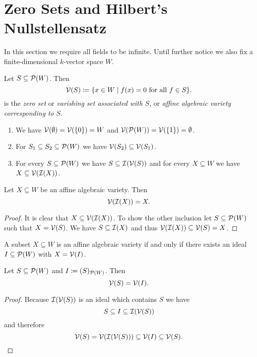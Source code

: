 \section{Zero Sets and Hilbert’s Nullstellensatz}
In this section we require all fields to be infinite.
Until further notice we also fix a finite-dimensional $k$-vector space $W$.


\begin{defi}
  Let $S \subseteq \mathcal{P}(W)$.
  Then
  \[
              \mathcal{V}(S)
    \coloneqq \{
                x \in W
              \mid
                f(x) = 0
                \text{ for all }
                f \in S
              \}.
  \]
  is the \emph{zero set} or \emph{varishing set associated with $S$}, or \emph{affine algebraic variety corresponding to $S$}.
\end{defi}


\begin{expls}
  \begin{enumerate}[label=\emph{\alph*)},leftmargin=*]
    \item
      We have $\mathcal{V}(\emptyset) = \mathcal{V}(\{0\}) = W$ and $\mathcal{V}(\mathcal{P}(W)) = \mathcal{V}(\{1\}) = \emptyset$.
    \item
      For $S_1 \subseteq S_2 \subseteq \mathcal{P}(W)$ we have $\mathcal{V}(S_2) \subseteq \mathcal{V}(S_1)$.
    \item
      For every $S \subseteq \mathcal{P}(W)$ we have $S \subseteq \mathcal{I}(\mathcal{V}(S))$ and for every $X \subseteq W$ we have $X \subseteq \mathcal{V}(\mathcal{I}(X))$.
  \end{enumerate}
\end{expls}


\begin{lem}
  Let $X \subseteq W$ be an affine algebraic variety. Then
  \[
      \mathcal{V}(\mathcal{I}(X))
    = X.
  \]
\end{lem}
\begin{proof}
  It is clear that $X \subseteq \mathcal{V}(\mathcal{I}(X))$.
  To show the other inclusion let $S \subseteq \mathcal{P}(W)$ such that $X = \mathcal{V}(S)$.
  We have $S \subseteq \mathcal{I}(X)$ and thus $\mathcal{V}(\mathcal{I}(X)) \subseteq \mathcal{V}(S) = X$.
\end{proof}


\begin{cor}
  A subset $X \subseteq W$ is an affine algebraic variety if and only if there exists an ideal $I \subseteq \mathcal{P}(W)$ with $X = \mathcal{V}(I)$.
\end{cor}


\begin{cor}
  Let $S \subseteq \mathcal{P}(W)$ and $I \coloneqq (S)_{\mathcal{P}(W)}$. Then
  \[
      \mathcal{V}(S)
    = \mathcal{V}(I).
  \]
\end{cor}
\begin{proof}
  Because $\mathcal{I}(\mathcal{V}(S))$ is an ideal which contains $S$ we have
  \[
              S
    \subseteq I
    \subseteq \mathcal{I}(\mathcal{V}(S))
  \]
  and therefore
  \[
              \mathcal{V}(S)
    =         \mathcal{V}( \mathcal{I}( \mathcal{V}(S) ) )
    \subseteq \mathcal{V}(I)
    \subseteq \mathcal{V}(S).
    \qedhere
  \]
\end{proof}


